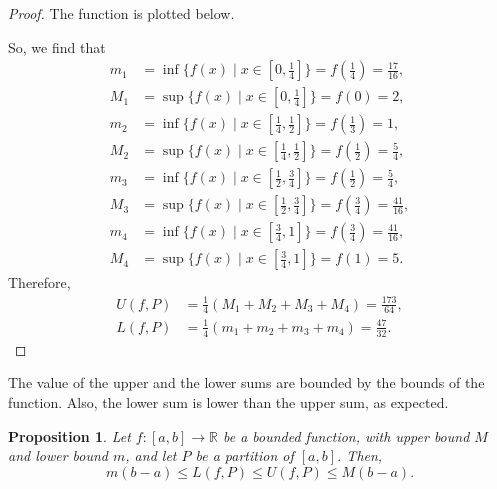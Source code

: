 \documentclass[a4paper, openany]{memoir}
\theoremstyle{definition}
\theoremstyle{plain}
\newtheorem{proposition}[definition]{Proposition}
\begin{document}
\begin{proof}
The function is plotted below.
\begin{figure}[H]
    \centering
\end{figure}
So, we find that
\begin{align*}
    m_1 &= \inf \{f(x) \mid x \in [0, \tfrac{1}{4}]\} = f(\tfrac{1}{4}) = \tfrac{17}{16}, \\
    M_1 &= \sup \{f(x) \mid x \in [0, \tfrac{1}{4}]\} = f(0) = 2, \\
    m_2 &= \inf \{f(x) \mid x \in [\tfrac{1}{4}, \tfrac{1}{2}]\} = f(\tfrac{1}{3}) = 1, \\
    M_2 &= \sup \{f(x) \mid x \in [\tfrac{1}{4}, \tfrac{1}{2}]\} = f(\tfrac{1}{2}) = \tfrac{5}{4}, \\
    m_3 &= \inf \{f(x) \mid x \in [\tfrac{1}{2}, \tfrac{3}{4}]\} = f(\tfrac{1}{2}) = \tfrac{5}{4}, \\
    M_3 &= \sup \{f(x) \mid x \in [\tfrac{1}{2}, \tfrac{3}{4}]\} = f(\tfrac{3}{4}) = \tfrac{41}{16}, \\
    m_4 &= \inf \{f(x) \mid x \in [\tfrac{3}{4}, 1]\} = f(\tfrac{3}{4}) = \tfrac{41}{16}, \\
    M_4 &= \sup \{f(x) \mid x \in [\tfrac{3}{4}, 1]\} = f(1) = 5.
\end{align*}
Therefore,
\begin{align*}
    U(f, P) &= \frac{1}{4} (M_1 + M_2 + M_3 + M_4) = \frac{173}{64}, \\
    L(f, P) &= \frac{1}{4} (m_1 + m_2 + m_3 + m_4) = \frac{47}{32}.
\end{align*}
\end{proof}
\noindent The value of the upper and the lower sums are bounded by the bounds of the function. Also, the lower sum is lower than the upper sum, as expected.
\begin{proposition}
Let $f: [a, b] \to \mathbb{R}$ be a bounded function, with upper bound $M$ and lower bound $m$, and let $P$ be a partition of $[a, b]$. Then,
\[m(b - a) \leqslant  L(f, P) \leqslant U(f, P) \leqslant M(b - a).\]
\end{proposition}
\end{document}
